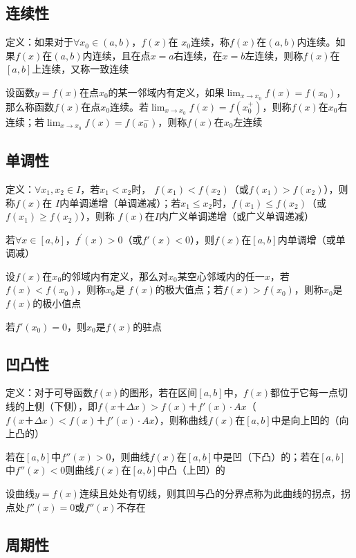 \documentclass[12pt]{book}
\begin{document}
\subsection{连续性}

定义：如果对于$\forall x_0\in (a,b)$，$f(x)$在 $x_0$连续，称$f(x)$在$(a,b)$内连续。如果$f(x)$在$(a,b)$内连续，且在点$x=a$右连续，在$x=b$左连续，则称$f(x)$在$[a,b]$上连续，又称一致连续

设函数$y=f(x)$在点$x_0$的某一邻域内有定义，如果$\lim_{x\rightarrow x_0}{f(x)}= f(x_0)$，那么称函数$f(x)$在点$x_0$连续。若$\lim_{x\rightarrow x_0}{f(x)}= f(x_0^+)$，则称$f(x)$在$x_0$右连续；若$\lim_{x\rightarrow x_0}{f(x)}= f(x_0^-)$，则称$f(x)$在$x_0$左连续

\subsection{单调性}

定义：$\forall x_1, x_2\in I$，若$x_1<x_2$时， $f(x_1)<f(x_2)$（或$f(x_1)>f(x_2)$），则称$f(x)$在 $I$内单调递增（单调递减）；若$x_1\leq x_2$时，$f(x_1)\leq f(x_2)$（或$f(x_1)\geq f(x_2)$），则称 $f(x)$在$I$内广义单调递增（或广义单调递减）

若$\forall x\in[a,b]$，$f^\prime(x)>0$（或$f'(x)<0$），则$f(x)$在$[a,b]$内单调增（或单调减）

设$ f(x)$在$x_0$的邻域内有定义，那么对$x_0$某空心邻域内的任一$x$，若$f(x)< f(x_0)$，则称$x_0$是 $f(x)$的极大值点；若$f(x)> f(x_0)$，则称$x_0$是 $f(x)$的极小值点

若$f'(x_0)=0$，则$x_0$是$f(x)$的驻点

\subsection{凹凸性}

定义：对于可导函数$f(x)$的图形，若在区间$[a,b]$中，$f(x)$都位于它每一点切线的上侧（下侧），即$ f(x＋\Delta x)>f(x)＋f'(x)\cdot A x$（$ f(x＋\Delta x)<f(x)＋f'(x)\cdot A x$），则称曲线$f(x)$在$[a,b]$中是向上凹的（向上凸的）


若在$[a,b]$中$ f''(x)> 0$，则曲线$f(x)$在$[a,b]$中是凹（下凸）的；若在$[a,b]$中$f''(x)<0$则曲线$f(x)$在$[a,b]$中凸（上凹）的

设曲线$y=f(x)$连续且处处有切线，则其凹与凸的分界点称为此曲线的拐点，拐点处$f''(x)=0$或$f''(x)$不存在

\subsection{周期性}
\end{document}
